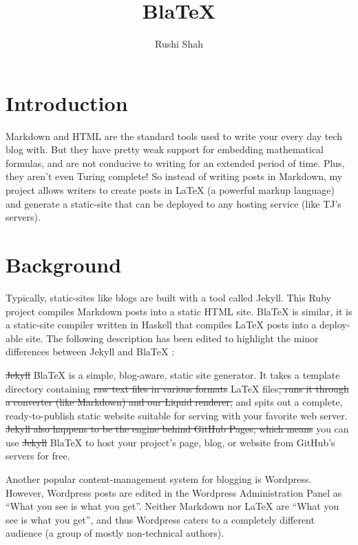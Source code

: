 \documentclass[doc,apacite,12pt]{apa6}
\title{BlaTeX}
\author{Rushi Shah}
\affiliation{TJHSST}
\newcommand{\bx}{BlaTeX }
\begin{document}
\maketitle    


         
\section{Introduction}

Markdown and HTML are the standard tools used to write your every day tech blog with. But they have pretty weak support for embedding mathematical formulas, and are not conducive to writing for an extended period of time. Plus, they aren't even Turing complete! So instead of writing posts in Markdown, my project allows writers to create posts in LaTeX (a powerful markup language) and generate a static-site that can be deployed to any hosting service (like TJ's servers).

\section{Background}

Typically, static-sites like blogs are built with a tool called Jekyll. This Ruby project compiles Markdown posts into a static HTML site. \bx is similar, it is a static-site compiler written in Haskell that compiles LaTeX posts into a deploy-able site. The following description has been edited to highlight the minor differences between Jekyll and \bx:

\sout{Jekyll} BlaTeX is a simple, blog-aware, static site generator. It takes a template directory containing \sout{raw text files in various formats} LaTeX files\sout{, runs it through a converter (like Markdown) and our Liquid renderer,} and spits out a complete, ready-to-publish static website suitable for serving with your favorite web server. \sout{Jekyll also happens to be the engine behind GitHub Pages, which means} you can use \sout{Jekyll} BlaTeX to host your project's page, blog, or website from GitHub's servers for free.

Another popular content-management system for blogging is Wordpress. However, Wordpress posts are edited in the Wordpress Administration Panel as ``What you see is what you get''. Neither Markdown nor LaTeX are ``What you see is what you get'', and thus Wordpress caters to a completely different audience (a group of mostly non-technical authors). 
\end{document}
